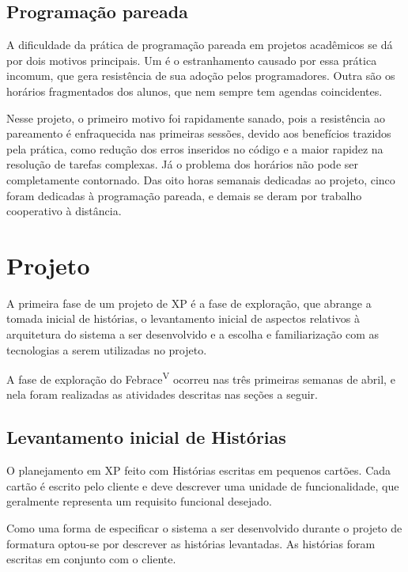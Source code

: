   \subsection{Programação pareada}
    A dificuldade da prática de programação pareada em projetos acadêmicos se dá por dois motivos principais. Um é o estranhamento causado por essa prática incomum, que gera resistência de sua adoção pelos programadores. Outra são os horários fragmentados dos alunos, que nem sempre tem agendas coincidentes.

    Nesse projeto, o primeiro motivo foi rapidamente sanado, pois a resistência ao pareamento é enfraquecida nas primeiras sessões, devido aos benefícios trazidos pela prática, como redução dos erros inseridos no código e a maior rapidez na resolução de tarefas complexas. Já o problema dos horários não pode ser completamente contornado. Das oito horas semanais dedicadas ao projeto, cinco foram dedicadas à programação pareada, e demais se deram por trabalho cooperativo à distância.

\section{Projeto}

  A primeira fase de um projeto de XP é a fase de exploração\cite{beck04}, que abrange a tomada inicial de histórias, o levantamento inicial de aspectos relativos à arquitetura do sistema a ser desenvolvido e a escolha e familiarização com as tecnologias a serem utilizadas no projeto.

  A fase de exploração do Febrace\textsuperscript{V} ocorreu nas três primeiras semanas de abril, e nela foram realizadas as atividades descritas nas seções a seguir.

  \subsection{Levantamento inicial de Histórias}

    O planejamento em XP feito com Histórias escritas em pequenos cartões. Cada cartão é escrito pelo cliente e deve descrever uma unidade de funcionalidade, que geralmente representa um requisito funcional desejado\cite{sato07}.

    Como uma forma de especificar o sistema a ser desenvolvido durante o projeto de formatura optou-se por descrever as histórias levantadas. As histórias foram escritas em conjunto com o cliente.

